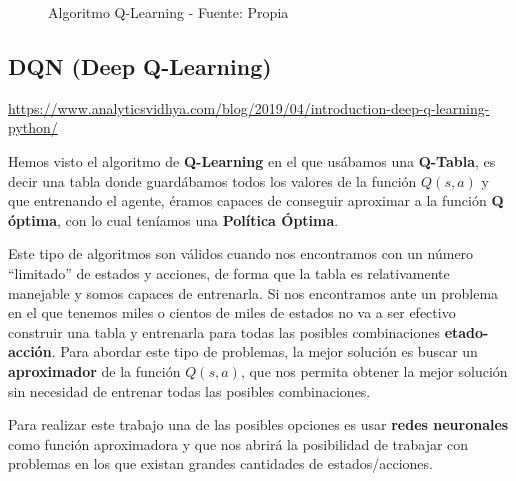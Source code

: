 \documentclass[
  a4paper,
  DIV=11,
  numbers=noendperiod]{scrreprt}
\begin{document}
\begin{figure}


\caption{\label{fig-rl_algoritmo_qlearning}Algoritmo Q-Learning -
Fuente: Propia}

\end{figure}%

\subsection{DQN (Deep Q-Learning)}\label{dqn-deep-q-learning}

\url{https://www.analyticsvidhya.com/blog/2019/04/introduction-deep-q-learning-python/}

Hemos visto el algoritmo de \textbf{Q-Learning} en el que usábamos una
\textbf{Q-Tabla}, es decir una tabla donde guardábamos todos los valores
de la función \(Q(s,a)\) y que entrenando el agente, éramos capaces de
conseguir aproximar a la función \textbf{Q óptima}, con lo cual teníamos
una \textbf{Política Óptima}.

Este tipo de algoritmos son válidos cuando nos encontramos con un número
``limitado'' de estados y acciones, de forma que la tabla es
relativamente manejable y somos capaces de entrenarla. Si nos
encontramos ante un problema en el que tenemos miles o cientos de miles
de estados no va a ser efectivo construir una tabla y entrenarla para
todas las posibles combinaciones \textbf{etado-acción}. Para abordar
este tipo de problemas, la mejor solución es buscar un
\textbf{aproximador} de la función \(Q(s,a)\), que nos permita obtener
la mejor solución sin necesidad de entrenar todas las posibles
combinaciones.

Para realizar este trabajo una de las posibles opciones es usar
\textbf{redes neuronales} como función aproximadora y que nos abrirá la
posibilidad de trabajar con problemas en los que existan grandes
cantidades de estados/acciones.
\end{document}
